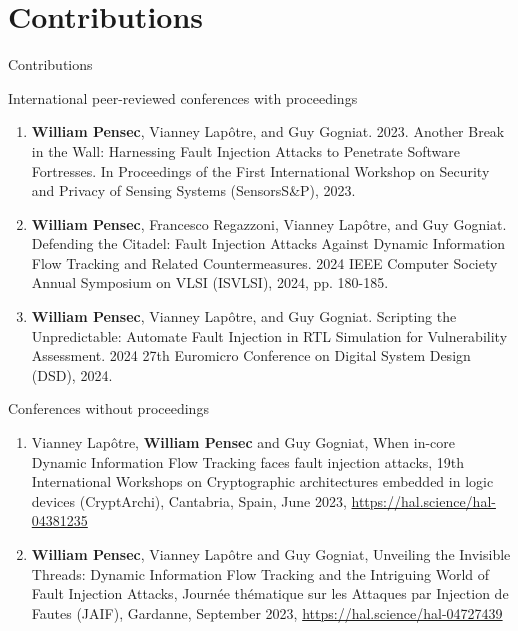 \section*{Contributions}

\begin{frame}[allowframebreaks]{Contributions}
    \begin{block}{International peer-reviewed conferences with proceedings}
        \begin{enumerate}
            \item {\scriptsize\textbf{William Pensec}, Vianney Lapôtre, and Guy Gogniat. 2023. Another Break in the Wall: Harnessing Fault Injection Attacks to Penetrate Software Fortresses. In Proceedings of the First International Workshop on Security and Privacy of Sensing Systems (SensorsS\&P), 2023.~\cite{PLG-23-SensorsSP}}
            \item {\scriptsize\textbf{William Pensec}, Francesco Regazzoni, Vianney Lapôtre, and Guy Gogniat. Defending the Citadel: Fault Injection Attacks Against Dynamic Information Flow Tracking and Related Countermeasures. 2024 IEEE Computer Society Annual Symposium on VLSI (ISVLSI), 2024, pp. 180-185.~\cite{PRLG-24-isvlsi}}
            \item {\scriptsize\textbf{William Pensec}, Vianney Lapôtre, and Guy Gogniat. Scripting the Unpredictable: Automate Fault Injection in RTL Simulation for Vulnerability Assessment. 2024 27th Euromicro Conference on Digital System Design (DSD), 2024.~\cite{PLG-24-dsd}}
        \end{enumerate}
    \end{block}

    \begin{block}{Conferences without proceedings}
        \begin{enumerate}
            \item {\scriptsize Vianney Lapôtre, \textbf{William Pensec} and Guy Gogniat, When in-core Dynamic Information Flow Tracking faces fault injection attacks, 19th International Workshops on Cryptographic architectures embedded in logic devices (CryptArchi), Cantabria, Spain, June 2023, \url{https://hal.science/hal-04381235}}
            \item {\scriptsize\textbf{William Pensec}, Vianney Lapôtre and Guy Gogniat, Unveiling the Invisible Threads: Dynamic Information Flow Tracking and the Intriguing World of Fault Injection Attacks, Journée thématique sur les Attaques par Injection de Fautes (JAIF), Gardanne, September 2023, \url{https://hal.science/hal-04727439}}
        \end{enumerate}
    \end{block}


\end{frame}
